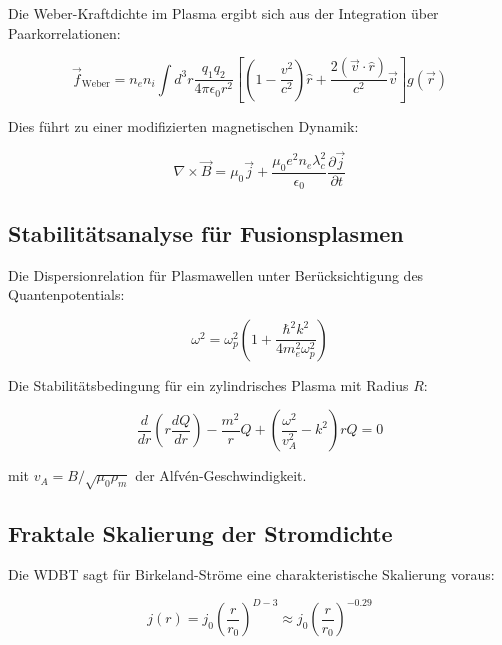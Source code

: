 Die Weber-Kraftdichte im Plasma ergibt sich aus der Integration über Paarkorrelationen:

\begin{equation}
\vec{f}_{\text{Weber}} = n_e n_i \int d^3r \frac{q_1 q_2}{4\pi\epsilon_0 r^2} \left[ \left(1-\frac{v^2}{c^2}\right)\hat{r} + \frac{2(\vec{v}\cdot\hat{r})}{c^2}\vec{v} \right] g(\vec{r})
\end{equation}

Dies führt zu einer modifizierten magnetischen Dynamik:

\begin{equation}
\label{eq:modified_ampere}
\nabla \times \vec{B} = \mu_0 \vec{j} + \frac{\mu_0 e^2 n_e \lambda_c^2}{\epsilon_0} \frac{\partial \vec{j}}{\partial t}
\end{equation}

\subsection{Stabilitätsanalyse für Fusionsplasmen}

Die Dispersionrelation für Plasmawellen unter Berücksichtigung des Quantenpotentials:

\begin{equation}
\label{eq:dispersion}
\omega^2 = \omega_p^2 \left(1 + \frac{\hbar^2 k^2}{4m_e^2 \omega_p^2}\right)
\end{equation}

Die Stabilitätsbedingung für ein zylindrisches Plasma mit Radius $R$:

\begin{equation}
\label{eq:stability}
\frac{d}{dr}\left(r\frac{dQ}{dr}\right) - \frac{m^2}{r}Q + \left(\frac{\omega^2}{v_A^2} - k^2\right)rQ = 0
\end{equation}

mit $v_A = B/\sqrt{\mu_0 \rho_m}$ der Alfvén-Geschwindigkeit.

\subsection{Fraktale Skalierung der Stromdichte}

Die WDBT sagt für Birkeland-Ströme eine charakteristische Skalierung voraus:

\begin{equation}
j(r) = j_0 \left(\frac{r}{r_0}\right)^{D-3} \approx j_0 \left(\frac{r}{r_0}\right)^{-0.29}
\end{equation}

